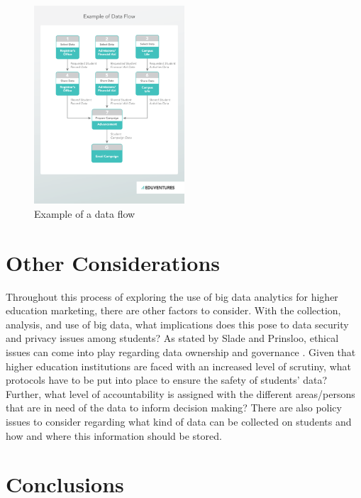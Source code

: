 \documentclass[sigconf]{acmart}
\begin{document}
\begin{figure}[p!]
    \includegraphics[width=0.5\textwidth]{dataflow2}
    \caption{Example of a data flow \cite{Wiley2016}}
    \label{fig:figure1}
\end{figure}

\section{Other Considerations}
Throughout this process of exploring the use of big data analytics for higher education marketing, there are other factors to consider. With the collection, analysis, and use of big data, what implications does this pose to data security and privacy issues among students? As stated by Slade and Prinsloo, ethical issues can come into play regarding data ownership and governance \cite{Slade2013}. Given that higher education institutions are faced with an increased level of scrutiny, what protocols have to be put into place to ensure the safety of students' data? Further, what level of accountability is assigned with the different areas/persons that are in need of the data to inform decision making? There are also policy issues to consider regarding what kind of data can be collected on students and how and where this information should be stored. 

\section{Conclusions}
\end{document}
